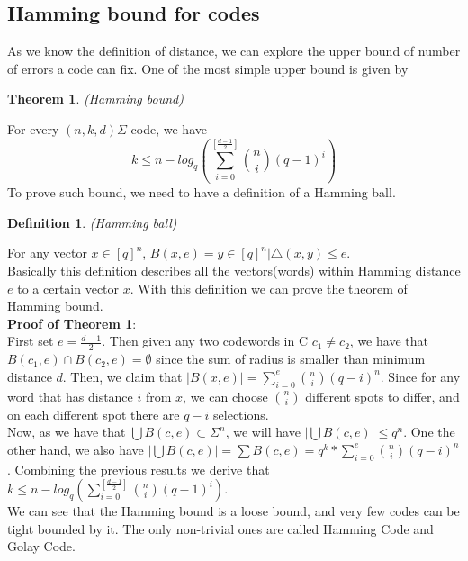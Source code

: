 \documentclass{article}
\newtheorem{Definition}{Definition}
\newtheorem{Theorem}{Theorem}
\begin{document}
\subsection{Hamming bound for codes}
As we know the definition of distance, we can explore the upper bound of number of errors a code can fix. One of the most simple upper bound is given by
\begin{Theorem}(Hamming bound)\end{Theorem}
\noindent For every $(n,k,d) \Sigma$ code, we have
\begin{equation}
k \le n - log_q(\sum_{i=0}^{[\frac{d-1}{2}]}{n \choose i} (q-1)^i)
\end{equation}
To prove such bound, we need to have a definition of a Hamming ball.
\begin{Definition}(Hamming ball)\end{Definition}
\noindent For any vector $x \in [q]^n$,
$B(x,e) = {y \in [q]^n | \bigtriangleup (x,y) \le e}$.\\
Basically this definition describes all the vectors(words) within Hamming distance $e$ to a certain vector $x$. With this definition we can prove the theorem of Hamming bound.\\
\textbf{Proof of Theorem 1}:\\First set $e = \frac{d-1}{2}$. Then given any two codewords in C $c_1 \neq c_2$, we have that $B(c_1,e) \cap B(c_2,e) = \emptyset$ since the sum of radius is smaller than minimum distance $d$. Then, we claim that $|B(x,e)| = \sum_{i=0}^{e} {n \choose i}(q-i)^n$. Since for any word that has distance $i$ from $x$, we can choose ${n \choose i}$ different spots to differ, and on each different spot there are $q-i$ selections.\\
Now, as we have that $\bigcup B(c,e) \subset \Sigma^n$, we will have $|\bigcup B(c,e)| \le q^n$. One the other hand, we also have $|\bigcup B(c,e)| = \sum B(c,e) = q^k* \sum_{i=0}^{e} {n \choose i}(q-i)^n$. Combining the previous results we derive that $k \le n - log_q(\sum_{i=0}^{[\frac{d-1}{2}]}{n \choose i} (q-1)^i)$.\\
We can see that the Hamming bound is a loose bound, and very few codes can be tight bounded by it. The only non-trivial ones are called Hamming Code and Golay Code.\\
\end{document}
